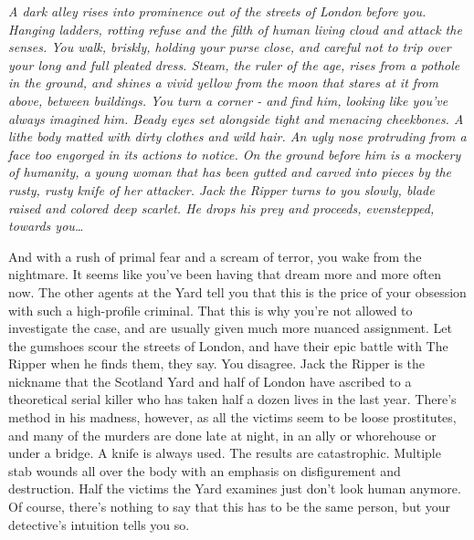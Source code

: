\documentclass[char]{airship}
\begin{document}
\name{\cWhore{}}


{\it A dark alley rises into prominence out of the streets of London before you. Hanging ladders, rotting refuse and the filth of human living cloud and attack the senses. You walk, briskly, holding your purse close, and careful not to trip over your long and full pleated dress. Steam, the ruler of the age, rises from a pothole in the ground, and shines a vivid yellow from the moon that stares at it from above, between buildings. You turn a corner - and find him, looking like you've always imagined him. Beady eyes set alongside tight and menacing cheekbones. A lithe body matted with dirty clothes and wild hair. An ugly nose protruding from a face too engorged in its actions to notice. On the ground before him is a mockery of humanity, a young woman that has been gutted and carved into pieces by the rusty, rusty knife of her attacker. Jack the Ripper turns to you slowly, blade raised and colored deep scarlet. He drops his prey and proceeds, evenstepped, towards you{\ldots}}

And with a rush of primal fear and a scream of terror, you wake from the nightmare. It seems like you've been having that dream more and more often now. The other agents at the Yard tell you that this is the price of your obsession with such a high-profile criminal. That this is why you're not allowed to investigate the case, and are usually given much more nuanced assignment. Let the gumshoes scour the streets of London, and have their epic battle with The Ripper when he finds them, they say. You disagree. Jack the Ripper is the nickname that the Scotland Yard and half of London have ascribed to a theoretical serial killer who has taken half a dozen lives in the last year. There's method in his madness, however, as all the victims seem to be loose prostitutes, and many of the murders are done late at night, in an ally or whorehouse or under a bridge. A knife is always used. The results are catastrophic. Multiple stab wounds all over the body with an emphasis on disfigurement and destruction. Half the victims the Yard examines just don't look human anymore. Of course, there's nothing to say that this has to be the same person, but your detective's intuition tells you so. 
\end{document}
